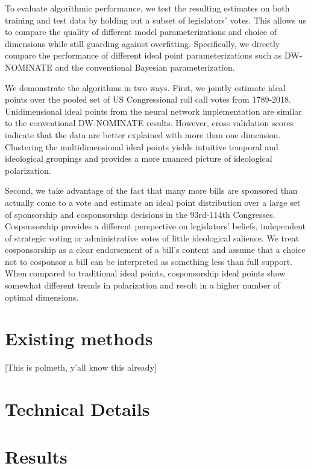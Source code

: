 \documentclass[11pt,]{article}
\begin{document}
To evaluate algorithmic performance, we test the resulting estimates on
both training and test data by holding out a subset of legislators'
votes. This allows us to compare the quality of different model
parameterizations and choice of dimensions while still guarding against
overfitting. Specifically, we directly compare the performance of
different ideal point parameterizations such as DW-NOMINATE and the
conventional Bayesian parameterization.

We demonstrate the algorithms in two ways. First, we jointly estimate
ideal points over the pooled set of US Congressional roll call votes
from 1789-2018. Unidimensional ideal points from the neural network
implementation are similar to the conventional DW-NOMINATE results.
However, cross validation scores indicate that the data are better
explained with more than one dimension. Clustering the multidimensional
ideal points yields intuitive temporal and ideological groupings and
provides a more nuanced picture of ideological polarization.

Second, we take advantage of the fact that many more bills are sponsored
than actually come to a vote and estimate an ideal point distribution
over a large set of sponsorship and cosponsorship decisions in the
93rd-114th Congresses. Cosponsorship provides a different perspective on
legislators' beliefs, independent of strategic voting or administrative
votes of little ideological salience. We treat cosponsorship as a clear
endorsement of a bill's content and assume that a choice not to
cosponsor a bill can be interpreted as something less than full support.
When compared to traditional ideal points, cosponsorship ideal points
show somewhat different trends in polarization and result in a higher
number of optimal dimensions.

\section{Existing methods}\label{existing-methods}

{[}This is polmeth, y'all know this already{]}

\section{Technical Details}\label{technical-details}

\section{Results}\label{results}
\end{document}
